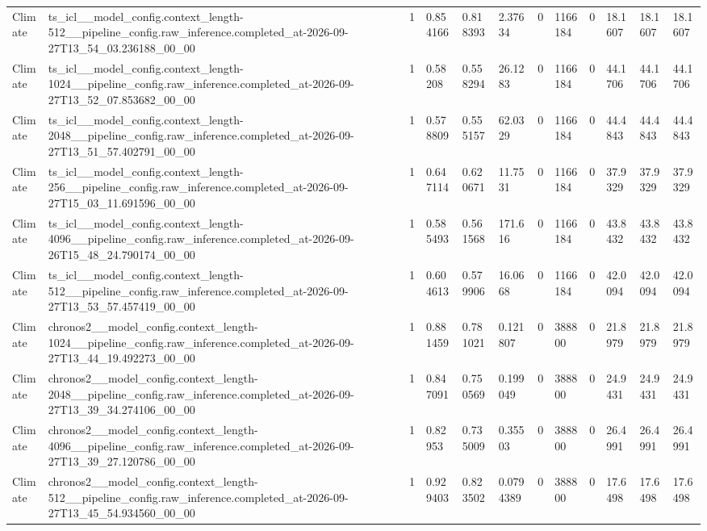 \begin{tabular}{llllllllllll}
Climate & ts\_icl\_\_model\_config.context\_length-512\_\_pipeline\_config.raw\_inference.completed\_at-2026-09-27T13\_54\_03.236188\_00\_00 & 1 & 0.854166 & 0.818393 & 2.37634 & 0 & 1166184 & 0 & 18.1607 & 18.1607 & 18.1607 \\
Climate & ts\_icl\_\_model\_config.context\_length-1024\_\_pipeline\_config.raw\_inference.completed\_at-2026-09-27T13\_52\_07.853682\_00\_00 & 1 & 0.58208 & 0.558294 & 26.1283 & 0 & 1166184 & 0 & 44.1706 & 44.1706 & 44.1706 \\
Climate & ts\_icl\_\_model\_config.context\_length-2048\_\_pipeline\_config.raw\_inference.completed\_at-2026-09-27T13\_51\_57.402791\_00\_00 & 1 & 0.578809 & 0.555157 & 62.0329 & 0 & 1166184 & 0 & 44.4843 & 44.4843 & 44.4843 \\
Climate & ts\_icl\_\_model\_config.context\_length-256\_\_pipeline\_config.raw\_inference.completed\_at-2026-09-27T15\_03\_11.691596\_00\_00 & 1 & 0.647114 & 0.620671 & 11.7531 & 0 & 1166184 & 0 & 37.9329 & 37.9329 & 37.9329 \\
Climate & ts\_icl\_\_model\_config.context\_length-4096\_\_pipeline\_config.raw\_inference.completed\_at-2026-09-26T15\_48\_24.790174\_00\_00 & 1 & 0.585493 & 0.561568 & 171.616 & 0 & 1166184 & 0 & 43.8432 & 43.8432 & 43.8432 \\
Climate & ts\_icl\_\_model\_config.context\_length-512\_\_pipeline\_config.raw\_inference.completed\_at-2026-09-27T13\_53\_57.457419\_00\_00 & 1 & 0.604613 & 0.579906 & 16.0668 & 0 & 1166184 & 0 & 42.0094 & 42.0094 & 42.0094 \\
Climate & chronos2\_\_model\_config.context\_length-1024\_\_pipeline\_config.raw\_inference.completed\_at-2026-09-27T13\_44\_19.492273\_00\_00 & 1 & 0.881459 & 0.781021 & 0.121807 & 0 & 388800 & 0 & 21.8979 & 21.8979 & 21.8979 \\
Climate & chronos2\_\_model\_config.context\_length-2048\_\_pipeline\_config.raw\_inference.completed\_at-2026-09-27T13\_39\_34.274106\_00\_00 & 1 & 0.847091 & 0.750569 & 0.199049 & 0 & 388800 & 0 & 24.9431 & 24.9431 & 24.9431 \\
Climate & chronos2\_\_model\_config.context\_length-4096\_\_pipeline\_config.raw\_inference.completed\_at-2026-09-27T13\_39\_27.120786\_00\_00 & 1 & 0.82953 & 0.735009 & 0.35503 & 0 & 388800 & 0 & 26.4991 & 26.4991 & 26.4991 \\
Climate & chronos2\_\_model\_config.context\_length-512\_\_pipeline\_config.raw\_inference.completed\_at-2026-09-27T13\_45\_54.934560\_00\_00 & 1 & 0.929403 & 0.823502 & 0.0794389 & 0 & 388800 & 0 & 17.6498 & 17.6498 & 17.6498 \\

\end{tabular}
